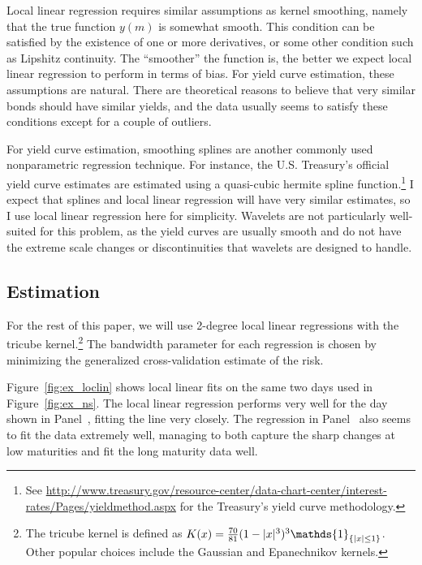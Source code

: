 \documentclass[12pt]{article}
\DeclarePairedDelimiter{\abs}{\lvert}{\rvert}
\newcommand*{\I}{\mathds{1}}
\begin{document}
Local linear regression requires similar assumptions as kernel smoothing, namely that the true function $y(m)$ is somewhat smooth. This condition can be satisfied by the existence of one or more derivatives, or some other condition such as Lipshitz continuity. The ``smoother'' the function is, the better we expect local linear regression to perform in terms of bias. For yield curve estimation, these assumptions are natural. There are theoretical reasons to believe that very similar bonds should have similar yields, and the data usually seems to satisfy these conditions except for a couple of outliers.

For yield curve estimation, smoothing splines are another commonly used nonparametric regression technique. For instance, the U.S. Treasury's official yield curve estimates are estimated using a quasi-cubic hermite spline function.\footnote{See \url{http://www.treasury.gov/resource-center/data-chart-center/interest-rates/Pages/yieldmethod.aspx} for the Treasury's yield curve methodology.} I expect that splines and local linear regression will have very similar estimates, so I use local linear regression here for simplicity. Wavelets are not particularly well-suited for this problem, as the yield curves are usually smooth and do not have the extreme scale changes or discontinuities that wavelets are designed to handle.


\subsection{Estimation}

For the rest of this paper, we will use 2-degree local linear regressions with the tricube kernel.\footnote{The tricube kernel is defined as $K(x) = \frac{70}{81} (1 - \abs{x}^3)^3 \I_{\{\abs{x} \leq 1\}}$. Other popular choices include the Gaussian and Epanechnikov kernels.} The bandwidth parameter for each regression is chosen by minimizing the generalized cross-validation estimate of the risk.

Figure~\ref{fig:ex_loclin} shows local linear fits on the same two days used in Figure~\ref{fig:ex_ns}. The local linear regression performs very well for the day shown in Panel~, fitting the line very closely. The regression in Panel~ also seems to fit the data extremely well, managing to both capture the sharp changes at low maturities and fit the long maturity data well.
\end{document}
